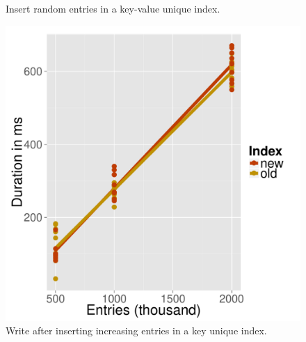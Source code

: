 \documentclass[11pt,a4paper,oneside]{article}
\begin{document}
\begin{figure}[p]
{\begin{minipage}{0.3\textwidth}
      \caption{Insert random entries in a key-value unique index.}
      \label{fig:nonunique_random_insert}
      \end{minipage}
      \hspace{0.05\textwidth}
      \begin{minipage}{0.3\textwidth}
      \includegraphics[scale=0.30]{images/unique_increasing_write.pdf} 
      \caption{Write after inserting increasing entries in a key unique index.}
      \label{fig:unique_increasing_write}
      \end{minipage}
    }
\end{figure}
\end{document}

